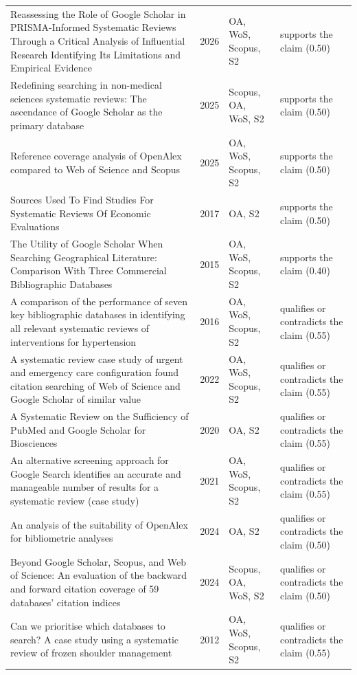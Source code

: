\begin{longtable}{@{}%
  >{\raggedright\arraybackslash}p{}c%
  >{\raggedright\arraybackslash}p{}%
  >{\raggedright\arraybackslash}p{}@{}}
Reassessing the Role of Google Scholar in PRISMA-Informed Systematic Reviews Through a Critical Analysis of Influential Research Identifying Its Limitations and Empirical Evidence & 2026 & OA, WoS, Scopus, S2 & supports the claim (0.50) \\
Redefining searching in non-medical sciences systematic reviews: The ascendance of Google Scholar as the primary database & 2025 & Scopus, OA, WoS, S2 & supports the claim (0.50) \\
Reference coverage analysis of OpenAlex compared to Web of Science and Scopus & 2025 & OA, WoS, Scopus, S2 & supports the claim (0.50) \\
Sources Used To Find Studies For Systematic Reviews Of Economic Evaluations & 2017 & OA, S2 & supports the claim (0.50) \\
The Utility of Google Scholar When Searching Geographical Literature: Comparison With Three Commercial Bibliographic Databases & 2015 & OA, WoS, Scopus, S2 & supports the claim (0.40) \\
A comparison of the performance of seven key bibliographic databases in identifying all relevant systematic reviews of interventions for hypertension & 2016 & OA, WoS, Scopus, S2 & qualifies or contradicts the claim (0.55) \\
A systematic review case study of urgent and emergency care configuration found citation searching of Web of Science and Google Scholar of similar value & 2022 & OA, WoS, Scopus, S2 & qualifies or contradicts the claim (0.55) \\
A Systematic Review on the Sufficiency of PubMed and Google Scholar for Biosciences & 2020 & OA, S2 & qualifies or contradicts the claim (0.55) \\
An alternative screening approach for Google Search identifies an accurate and manageable number of results for a systematic review (case study) & 2021 & OA, WoS, Scopus, S2 & qualifies or contradicts the claim (0.55) \\
An analysis of the suitability of OpenAlex for bibliometric analyses & 2024 & OA, S2 & qualifies or contradicts the claim (0.50) \\
Beyond Google Scholar, Scopus, and Web of Science: An evaluation of the backward and forward citation coverage of 59 databases' citation indices & 2024 & Scopus, OA, WoS, S2 & qualifies or contradicts the claim (0.50) \\
Can we prioritise which databases to search? A case study using a systematic review of frozen shoulder management & 2012 & OA, WoS, Scopus, S2 & qualifies or contradicts the claim (0.55) \\

\end{longtable}
